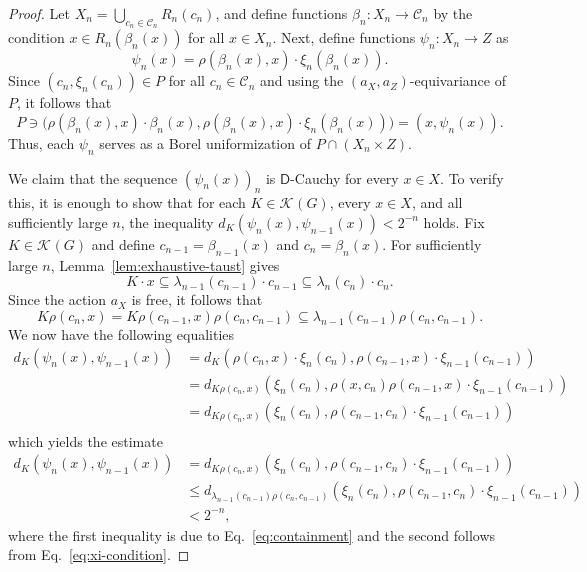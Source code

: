 \documentclass[12pt]{paper}
\numberwithin{equation}{section}
\theoremstyle{plain}
\theoremstyle{definition}
\newcommand{\vietoris}[2][]{\mathcal{K}_{#1}(#2)}
\newcommand{\unifm}{\mathsf{D}}
\begin{document}
\begin{proof}
  Let \(X_{n} = \bigcup_{c_{n} \in \mathcal{C}_{n}} R_{n}(c_{n})\), and define functions
  \(\beta_{n} : X_{n} \to \mathcal{C}_{n}\) by the condition \(x \in R_{n}(\beta_{n}(x))\) for all
  \(x \in X_{n}\). Next, define functions \(\psi_{n} : X_{n} \to Z\) as
  \begin{equation}
    \label{eq:psi-n-definition}
      \psi_{n}(x) = \rho(\beta_{n}(x), x)\cdot \xi_{n}(\beta_{n}(x)).
  \end{equation}
  Since \((c_{n}, \xi_{n}(c_{n})) \in P\) for all \(c_{n} \in \mathcal{C}_{n}\) and using the
  \((a_{X},a_{Z})\)-equivariance of \(P\), it follows that
  \[
    P \ni \big(\rho(\beta_{n}(x), x)\cdot\beta_{n}(x), \rho(\beta_{n}(x),
    x)\cdot\xi_{n}(\beta_{n}(x))\big) = (x, \psi_{n}(x)).
  \]
  Thus, each \(\psi_{n}\) serves as a Borel uniformization of \(P \cap (X_{n} \times Z)\).

  We claim that the sequence \((\psi_{n}(x))_{n}\) is \(\unifm\)-Cauchy for every \(x \in X\). To
  verify this, it is enough to show that for each \(K \in \vietoris{G}\), every \(x \in X\), and all
  sufficiently large \(n\), the inequality \(d_{K}(\psi_{n}(x), \psi_{n-1}(x)) < 2^{-n}\) holds. Fix
  \(K \in \vietoris{G}\) and define \(c_{n-1} = \beta_{n-1}(x)\) and \(c_{n} = \beta_{n}(x)\). For
  sufficiently large \(n\), Lemma~\ref{lem:exhaustive-taust} gives
  \[
    K\cdot x \subseteq \lambda_{n-1}(c_{n-1})\cdot c_{n-1} \subseteq \lambda_{n}(c_{n})\cdot c_{n}.
  \]
  Since the action \(a_{X}\) is free, it follows that
  \begin{equation}
    \label{eq:containment}
    K\rho(c_{n},x) = K\rho(c_{n-1},x)\rho(c_{n},c_{n-1}) \subseteq
    \lambda_{n-1}(c_{n-1})\rho(c_{n},c_{n-1}).
  \end{equation}
  We now have the following equalities
  \begin{displaymath}
    \begin{aligned}
      d_{K}(\psi_{n}(x), \psi_{n-1}(x))
      &= d_{K}(\rho(c_{n},x)\cdot\xi_{n}(c_{n}), \rho(c_{n-1},x)\cdot\xi_{n-1}(c_{n-1})) \\
      &= d_{K\rho(c_{n}, x)}(\xi_{n}(c_{n}), \rho(x,c_{n})\rho(c_{n-1},x)\cdot\xi_{n-1}(c_{n-1})) \\
      &= d_{K\rho(c_{n}, x)}(\xi_{n}(c_{n}), \rho(c_{n-1},c_{n})\cdot\xi_{n-1}(c_{n-1})) \\
    \end{aligned}
  \end{displaymath}
  which yields the estimate
  \begin{equation}
    \label{eq:psi-n-cauchy}
    \begin{aligned}
      d_{K}(\psi_{n}(x), \psi_{n-1}(x))
      & = d_{K\rho(c_{n}, x)}(\xi_{n}(c_{n}),
        \rho(c_{n-1},c_{n})\cdot\xi_{n-1}(c_{n-1})) \\
      &\le
        d_{\lambda_{n-1}(c_{n-1})\rho(c_{n},c_{n-1})}(\xi_{n}(c_{n}),
        \rho(c_{n-1},c_{n})\cdot\xi_{n-1}(c_{n-1})) \\
      &< 2^{-n},
    \end{aligned}
  \end{equation}
  where the first inequality is due to Eq.~\eqref{eq:containment} and the second follows from
  Eq.~\eqref{eq:xi-condition}.


\end{proof}
\end{document}

